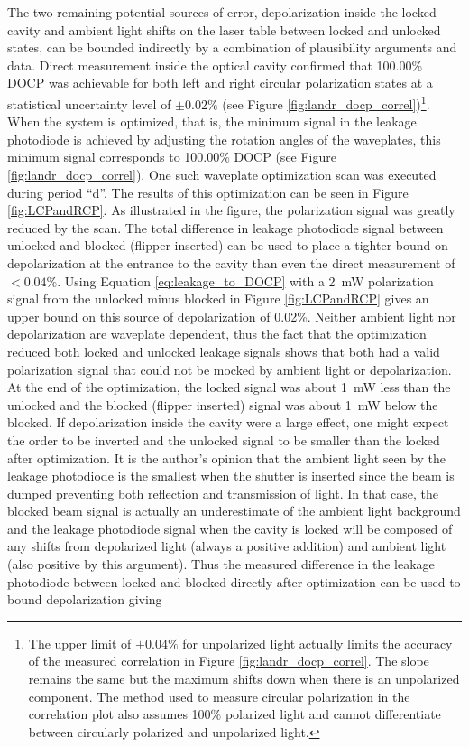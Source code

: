 The two remaining potential sources of error, depolarization inside the locked cavity and ambient light shifts on the laser table between locked and unlocked states, can be bounded indirectly by a combination of plausibility arguments and data. Direct measurement inside the optical cavity confirmed that 100.00\% DOCP was achievable for both left and right circular polarization states at a statistical uncertainty level of $\pm 0.02\%$ (see Figure \ref{fig:landr_docp_correl})\footnote{The upper limit of $\pm 0.04\%$  for unpolarized light actually limits the accuracy of the measured correlation in Figure \ref{fig:landr_docp_correl}. The slope remains the same but the maximum shifts down when there is an unpolarized component. The method used to measure circular polarization in the correlation plot also assumes 100\% polarized light and cannot differentiate between circularly polarized and unpolarized light. }. When the system is optimized, that is, the minimum signal in the leakage photodiode is achieved by adjusting the rotation angles of the waveplates, this minimum signal corresponds to 100.00\% DOCP (see Figure \ref{fig:landr_docp_correl}). One such waveplate optimization scan was executed during period ``d''. The results of this optimization can be seen in Figure \ref{fig:LCPandRCP}. As illustrated in the figure, the polarization signal was greatly reduced by the scan. The total difference in leakage photodiode signal between unlocked and blocked (flipper inserted) can be used to place a tighter bound on depolarization at the entrance to the cavity than even the direct measurement of $<0.04\%$. Using Equation \ref{eq:leakage_to_DOCP} with a 2~mW polarization signal from the unlocked minus blocked in Figure \ref{fig:LCPandRCP} gives an upper bound on this source of depolarization of 0.02\%. Neither ambient light nor depolarization are waveplate dependent, thus the fact that the optimization reduced both locked and unlocked leakage signals shows that both had a valid polarization signal that could not be mocked by ambient light or depolarization. At the end of the optimization, the locked signal was about 1~mW less than the unlocked and the blocked (flipper inserted) signal was about 1~mW below the blocked. If depolarization inside the cavity were a large effect, one might expect the order to be inverted and the unlocked signal to be smaller than the locked after optimization. It is the author's opinion that the ambient light seen by the leakage photodiode is the smallest when the shutter is inserted since the beam is dumped preventing both reflection and transmission of light. In that case, the blocked beam signal is actually an underestimate of the ambient light background and the leakage photodiode signal when the cavity is locked will be composed of any shifts from depolarized light (always a positive addition) and ambient light (also positive by this argument). Thus the measured difference in the leakage photodiode between locked and blocked directly after optimization can be used to bound depolarization giving 
